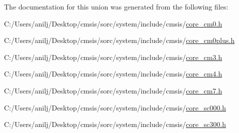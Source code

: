 The documentation for this union was generated from the following files\+:\begin{DoxyCompactItemize}
\item 
C\+:/\+Users/anilj/\+Desktop/cmsis/sorc/system/include/cmsis/\hyperlink{core__cm0_8h}{core\+\_\+cm0.\+h}\item 
C\+:/\+Users/anilj/\+Desktop/cmsis/sorc/system/include/cmsis/\hyperlink{core__cm0plus_8h}{core\+\_\+cm0plus.\+h}\item 
C\+:/\+Users/anilj/\+Desktop/cmsis/sorc/system/include/cmsis/\hyperlink{core__cm3_8h}{core\+\_\+cm3.\+h}\item 
C\+:/\+Users/anilj/\+Desktop/cmsis/sorc/system/include/cmsis/\hyperlink{core__cm4_8h}{core\+\_\+cm4.\+h}\item 
C\+:/\+Users/anilj/\+Desktop/cmsis/sorc/system/include/cmsis/\hyperlink{core__cm7_8h}{core\+\_\+cm7.\+h}\item 
C\+:/\+Users/anilj/\+Desktop/cmsis/sorc/system/include/cmsis/\hyperlink{core__sc000_8h}{core\+\_\+sc000.\+h}\item 
C\+:/\+Users/anilj/\+Desktop/cmsis/sorc/system/include/cmsis/\hyperlink{core__sc300_8h}{core\+\_\+sc300.\+h}\end{DoxyCompactItemize}

